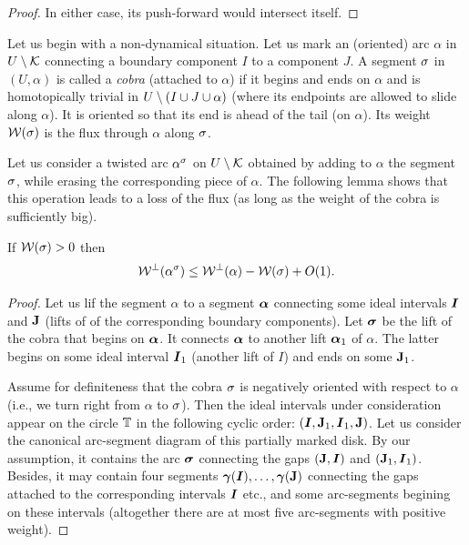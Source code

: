 {{\begin{proof}
In either case, its push-forward
would  intersect itself. 
\end{proof}



Let us begin with a non-dynamical situation. 
Let us mark an (oriented)  arc $\alpha$  in $U\setminus {\mathcal K}$ connecting a
boundary component  $I$ to a component $J$.  
A  segment ${\sigma}$ in $(U, \alpha)$  is called a {\it cobra}
(attached to  $\alpha$) if it  begins and  ends  on $\alpha$ and is
homotopically trivial in $U\setminus (I \cup J \cup \alpha)$ (where its endpoints
are allowed to slide along $\alpha$).  
It is oriented so that its end is ahead of the tail (on $\alpha$).  
 Its weight
${\mathcal W}({\sigma})$ is the flux through $\alpha$ along ${\sigma}$.  


 Let us consider a twisted arc $\alpha^{\sigma}$ on $U\setminus {\mathcal K}$  obtained by adding to $\alpha$
 the  segment ${\sigma}$, while erasing the corresponding piece of $\alpha$.  
The following lemma shows that this operation leads to a loss of the
flux (as long as the weight of the cobra is sufficiently big). 

\begin{lem}\label{loss of cobra}
If ${\mathcal W}({\sigma}) > 0 $ then 
$$
 {\mathcal W}^\perp (\alpha^{\sigma})  \leq  {\mathcal W}^\perp (\alpha) - {\mathcal W}( {\sigma} ) + O(1).
$$
\end{lem}

\begin{proof}
   Let us lif the segment $\alpha$ to a segment ${\mbox{\boldmath$\alpha$} }$ connecting some
   ideal intervals ${\boldsymbol{I}}$ and ${\mathbf{J}}$ (lifts of of the corresponding
   boundary components). 
   Let ${\boldsymbol{\sigma}}$ be the lift of the cobra that begins on ${\mbox{\boldmath$\alpha$} }$. It
   connects ${\mbox{\boldmath$\alpha$} }$ to another lift ${\mbox{\boldmath$\alpha$} }_1$ of $\alpha$.  
  The latter begins on some ideal interval  ${\boldsymbol{I}}_1$ (another lift of $I$)  and ends on some
  ${\mathbf{J}}_1$.

Assume for definiteness that the cobra ${\sigma}$ is negatively oriented
with respect to $\alpha$ (i.e.,  we turn right from $\alpha$ to
${\sigma}$). Then the ideal intervals under consideration appear on the
circle ${\Bbb T}$ in the following cyclic order: $({\boldsymbol{I}}, {\mathbf{J}}_1, {\boldsymbol{I}}_1, {\mathbf{J}}
)$. Let us consider the canonical arc-segment diagram of this partially marked
disk. By our assumption, it contains the arc ${\boldsymbol{\sigma}}$ connecting the gaps 
$({\mathbf{J}}, {\boldsymbol{I}})$ and $({\mathbf{J}}_1, {\boldsymbol{I}}_1)$. Besides, it may contain four segments ${\boldsymbol{\gamma}}({\boldsymbol{I}}), \dots,
{\boldsymbol{\gamma}}({\mathbf{J}})$ connecting the gaps attached to the corresponding intervals
${\boldsymbol{I}}$ etc., and  some arc-segments begining on these
intervals (altogether there are at most five arc-segments with
positive weight).   


\end{proof}}}
